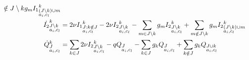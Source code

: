 \begin{footnotesize}
\begin{align}
{  \notin J \setminus k} g_m {I_1}^k_{\begin{subarray}{l} (J \setminus k) \cup m \\ a_i, c_l \end{subarray}}  \notag \\
\dot{I_2}^k_{\begin{subarray}{l}J \setminus k\\ a_i,
    c_l \end{subarray}} &=2 \nu {I_1}^k_{\begin{subarray}{l}J:k
    \notin J\\ a_i, c_l \end{subarray}} -2 \nu {I_2}^k_{\begin{subarray}{l}J \setminus k\\ a_i, c_l \end{subarray}} -\sum_{m
  \in J \setminus k} g_m {I_2}^k_{\begin{subarray}{l}J \setminus k\\ a_i, c_l \end{subarray}} + \sum_{m
  \notin J \setminus k} g_m {I_2}^k_{\begin{subarray}{l} (J \setminus k) \cup m \\ a_i, c_l \end{subarray}} 
\notag \\
\dot{Q}^k_{\begin{subarray}{l}J \\ a_i, c_l \end{subarray}}
&= \sum_{k \in J} 2 \nu {I_2}^k_{\begin{subarray}{l}J \setminus k\\
    a_i,
    c_l \end{subarray}} - q Q_{\begin{subarray}{l}J \\
    a_i, c_l \end{subarray}} -\sum_{k \in J} g_k
Q_{\begin{subarray}{l}J\\ a_i, c_l \end{subarray}} + \sum_{k \notin J}
g_k Q_{\begin{subarray}{l}J \cup k \\ a_i, c_l \end{subarray}} \notag
\end{align}
\end{footnotesize}

